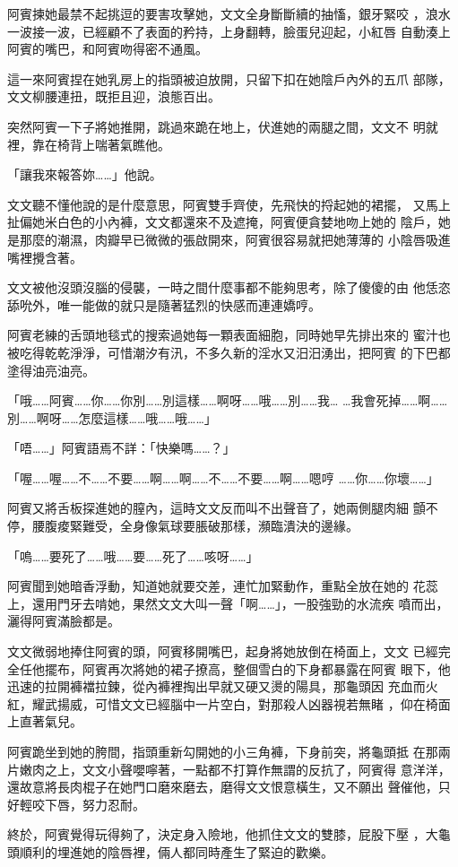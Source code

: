 阿賓揀她最禁不起挑逗的要害攻擊她，文文全身斷斷續的抽慉，銀牙緊咬
，浪水一波接一波，已經顧不了表面的矜持，上身翻轉，臉蛋兒迎起，小紅唇
自動湊上阿賓的嘴巴，和阿賓吻得密不通風。

這一來阿賓捏在她乳房上的指頭被迫放開，只留下扣在她陰戶內外的五爪
部隊，文文柳腰連扭，既拒且迎，浪態百出。

突然阿賓一下子將她推開，跳過來跪在地上，伏進她的兩腿之間，文文不
明就裡，靠在椅背上喘著氣瞧他。

「讓我來報答妳……」他說。

文文聽不懂他說的是什麼意思，阿賓雙手齊使，先飛快的捋起她的裙擺，
又馬上扯偏她米白色的小內褲，文文都還來不及遮掩，阿賓便貪婪地吻上她的
陰戶，她是那麼的潮濕，肉瓣早已微微的張啟開來，阿賓很容易就把她薄薄的
小陰唇吸進嘴裡攪含著。

文文被他沒頭沒腦的侵襲，一時之間什麼事都不能夠思考，除了傻傻的由
他恁恣舔吮外，唯一能做的就只是隨著猛烈的快感而連連嬌哼。

阿賓老練的舌頭地毯式的搜索過她每一顆表面細胞，同時她早先排出來的
蜜汁也被吃得乾乾淨淨，可惜潮汐有汛，不多久新的淫水又汨汨湧出，把阿賓
的下巴都塗得油亮油亮。

「哦……阿賓……你……你別……別這樣……啊呀……哦……別……我…
…我會死掉……啊……別……啊呀……怎麼這樣……哦……哦……」

「唔……」阿賓語焉不詳：「快樂嗎……？」

「喔……喔……不……不要……啊……啊……不……不要……啊……嗯哼
……你……你壞……」

阿賓又將舌板探進她的膣內，這時文文反而叫不出聲音了，她兩側腿肉細
顫不停，腰腹痠緊難受，全身像氣球要脹破那樣，瀕臨潰決的邊緣。

「嗚……要死了……哦……要……死了……咳呀……」

阿賓聞到她暗香浮動，知道她就要交差，連忙加緊動作，重點全放在她的
花蕊上，還用門牙去啃她，果然文文大叫一聲「啊……」，一股強勁的水流疾
噴而出，灑得阿賓滿臉都是。

文文微弱地捧住阿賓的頭，阿賓移開嘴巴，起身將她放倒在椅面上，文文
已經完全任他擺布，阿賓再次將她的裙子撩高，整個雪白的下身都暴露在阿賓
眼下，他迅速的拉開褲襠拉鍊，從內褲裡掏出早就又硬又燙的陽具，那龜頭因
充血而火紅，耀武揚威，可惜文文已經腦中一片空白，對那殺人凶器視若無睹
，仰在椅面上直著氣兒。

阿賓跪坐到她的胯間，指頭重新勾開她的小三角褲，下身前突，將龜頭抵
在那兩片嫩肉之上，文文小聲嚶嚀著，一點都不打算作無謂的反抗了，阿賓得
意洋洋，還故意將長肉棍子在她門口磨來磨去，磨得文文恨意橫生，又不願出
聲催他，只好輕咬下唇，努力忍耐。

終於，阿賓覺得玩得夠了，決定身入險地，他抓住文文的雙膝，屁股下壓
，大龜頭順利的埋進她的陰唇裡，倆人都同時產生了緊迫的歡樂。


